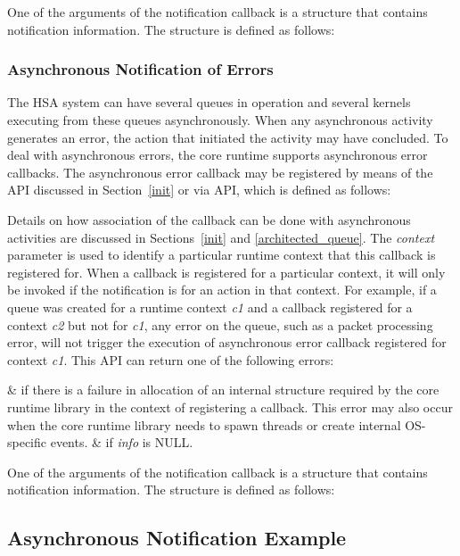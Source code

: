 One of the arguments of the notification callback is a structure
that contains notification information. The structure is defined as
follows:



\subsubsection{Asynchronous Notification of Errors}\label{asynnotif}

The HSA system can have several queues in operation and
several kernels executing from these queues asynchronously.
When any asynchronous activity generates an error, the action that
initiated the activity may have concluded. To deal with
asynchronous errors, the core runtime supports asynchronous error
callbacks. The asynchronous error callback may be registered by means of the
 API discussed in Section~\ref{init} or via
 API, which is defined as
follows:



Details on how association of the callback can be done with
asynchronous activities are discussed in Sections~\ref{init} and
\ref{architected_queue}. The {\itshape context} parameter is used
to identify a particular runtime context that this callback is
registered for. When a callback is registered for a particular
context, it will only be invoked if the notification is for an
action in that context. For example, if a queue was created for a
runtime context {\itshape c1} and a callback registered for a
context {\itshape c2} but not for {\itshape c1}, any error on the
queue, such as a packet processing error, will not trigger the
execution of asynchronous error callback registered for context
{\itshape c1}. This API can return one of the following errors:

\begin{easylist}
&  if there is a failure
in allocation of an internal structure required by the core runtime
library in the context of registering a callback. This error may
also occur when the core runtime library needs to spawn threads or
create internal OS-specific events. 
&  
if {\itshape info} is NULL.
\end{easylist}

One of the arguments of the notification callback is a structure
that contains notification information. The structure is defined as
follows:



\subsection{Asynchronous Notification Example}
\DIFdelbegin {}%
\DIFdelend \DIFaddbegin 

 \DIFaddend